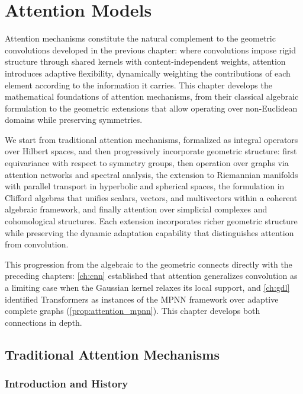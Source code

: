 \chapter{Attention Models}\label{ch:attention}

Attention mechanisms constitute the natural complement to the geometric convolutions developed in the previous chapter: where convolutions impose rigid structure through shared kernels with content-independent weights, attention introduces adaptive flexibility, dynamically weighting the contributions of each element according to the information it carries. This chapter develops the mathematical foundations of attention mechanisms, from their classical algebraic formulation to the geometric extensions that allow operating over non-Euclidean domains while preserving symmetries.

We start from traditional attention mechanisms, formalized as integral operators over Hilbert spaces, and then progressively incorporate geometric structure: first equivariance with respect to symmetry groups, then operation over graphs via attention networks and spectral analysis, the extension to Riemannian manifolds with parallel transport in hyperbolic and spherical spaces, the formulation in Clifford algebras that unifies scalars, vectors, and multivectors within a coherent algebraic framework, and finally attention over simplicial complexes and cohomological structures. Each extension incorporates richer geometric structure while preserving the dynamic adaptation capability that distinguishes attention from convolution.

This progression from the algebraic to the geometric connects directly with the preceding chapters: \autoref{ch:cnn} established that attention generalizes convolution as a limiting case when the Gaussian kernel relaxes its local support, and \autoref{ch:gdl} identified \glspl{Transformer} as instances of the \gls{MPNN} framework over adaptive complete graphs (\autoref{prop:attention_mpnn}). This chapter develops both connections in depth.

\section{Traditional Attention Mechanisms}\label{sec:atencion_tradicional}

\subsection{Introduction and History}\label{subsec:historia_atencion}


